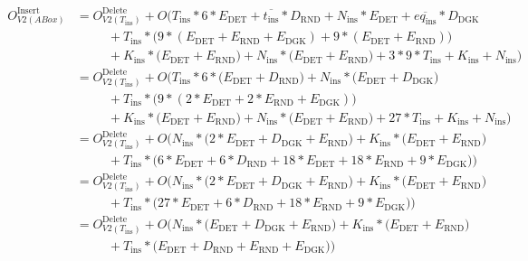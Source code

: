 \begin{align}
    \label{equation:update-insert-v2-layout}
    \begin{split}
        O^{\text{Insert}}_{V2 (ABox)} &= O^{\text{Delete}}_{V2 (T_{\text{ins}})} +
        O\Big(
            T_{\text{ins}} * 6 * E_{\text{DET}} + \overline{t_{\text{ins}}} * D_{\text{RND}} %
            + N_{\text{ins}} * E_{\text{DET}} + \overline{eq_{\text{ins}}} * D_{\text{DGK}} \\ %
            &\;\;\;\;\;\;\;\;\; + T_{\text{ins}} * \big( 9 * (E_{\text{DET}} + E_{\text{RND}} + E_{\text{DGK}}) + 9 * (E_{\text{DET}} + E_{\text{RND}})\big) \\ %
            &\;\;\;\;\;\;\;\;\; + K_{\text{ins}} * \big( E_{\text{DET}} + E_{\text{RND}} \big) + N_{\text{ins}} * \big( E_{\text{DET}} + E_{\text{RND}} \big) %
            + 3 * 9 * T_{\text{ins}} + K_{\text{ins}} + N_{\text{ins}} %
        \Big) \\
        &= O^{\text{Delete}}_{V2 (T_{\text{ins}})} + 
        O\Big(
            T_{\text{ins}} * 6 * \big(  E_{\text{DET}} + D_{\text{RND}} \big)
            + N_{\text{ins}} * \big( E_{\text{DET}} + D_{\text{DGK}} \big) \\ 
            &\;\;\;\;\;\;\;\;\; + T_{\text{ins}} * \big( 9 * ( 2 * E_{\text{DET}} + 2 * E_{\text{RND}} + E_{\text{DGK}}) \big) \\ 
            &\;\;\;\;\;\;\;\;\; + K_{\text{ins}} * \big( E_{\text{DET}} + E_{\text{RND}} \big) + N_{\text{ins}} * \big( E_{\text{DET}} + E_{\text{RND}} \big) 
            + 27 * T_{\text{ins}} + K_{\text{ins}} + N_{\text{ins}} 
        \Big) \\
        &= O^{\text{Delete}}_{V2 (T_{\text{ins}})} + 
        O\Big(
            N_{\text{ins}} * \big( 2 * E_{\text{DET}} + D_{\text{DGK}} + E_{\text{RND}} \big) + K_{\text{ins}} * \big( E_{\text{DET}} + E_{\text{RND}} \big) \\ 
            &\;\;\;\;\;\;\;\;\; + T_{\text{ins}} * \big( 6 * E_{\text{DET}} + 6 * D_{\text{RND}} + 18 * E_{\text{DET}} + 18 * E_{\text{RND}} + 9 * E_{\text{DGK}} \big)
        \Big) \\     
        &= O^{\text{Delete}}_{V2 (T_{\text{ins}})} + 
        O\Big(
            N_{\text{ins}} * \big( 2 * E_{\text{DET}} + D_{\text{DGK}} + E_{\text{RND}} \big) + K_{\text{ins}} * \big( E_{\text{DET}} + E_{\text{RND}} \big) \\ 
            &\;\;\;\;\;\;\;\;\; + T_{\text{ins}} * \big( 27 * E_{\text{DET}} + 6 * D_{\text{RND}} + 18 * E_{\text{RND}} + 9 * E_{\text{DGK}} \big)
        \Big) \\   
        &= O^{\text{Delete}}_{V2 (T_{\text{ins}})} + 
        O\Big(
            N_{\text{ins}} * \big( E_{\text{DET}} + D_{\text{DGK}} + E_{\text{RND}} \big) + K_{\text{ins}} * \big( E_{\text{DET}} + E_{\text{RND}} \big) \\ 
            &\;\;\;\;\;\;\;\;\; + T_{\text{ins}} * \big( E_{\text{DET}} + D_{\text{RND}} + E_{\text{RND}} + E_{\text{DGK}} \big)
        \Big) \\ 
    \end{split}
\end{align}

